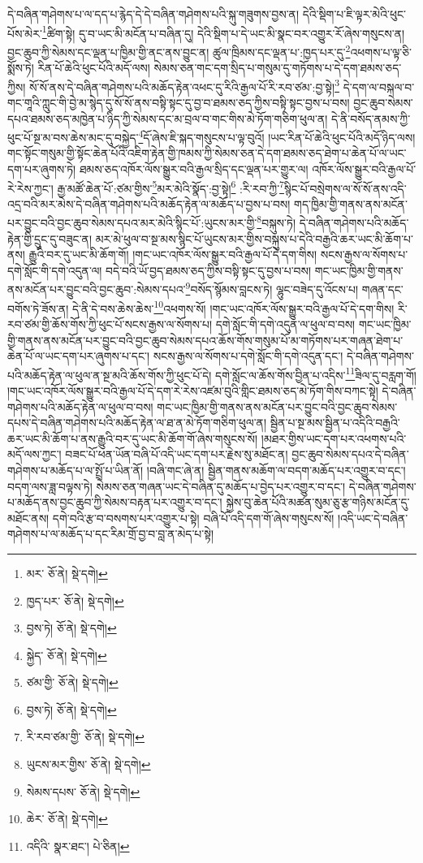དེ་བཞིན་གཤེགས་པ་ལ་དད་པ་རྙེད་དེ་དེ་བཞིན་གཤེགས་པའི་སྐུ་གཟུགས་བྱས་ན། དེའི་སྡིག་པ་ཇི་ལྟར་མེའི་ཕུང་པོས་མེར་\footnote{མར་  ཅོ་ནེ།  སྡེ་དགེ། }ཚིག་སྟེ། དུ་བ་ཡང་མི་མངོན་པ་བཞིན་དུ། དེའི་སྡིག་པ་དེ་ཡང་མི་སྣང་བར་འགྱུར་རོ་ཞེས་གསུངས་ན། བྱང་ཆུབ་ཀྱི་སེམས་དང་ལྡན་པ་ཁྱིམ་གྱི་ནང་ནས་བྱུང་ན། ཚུལ་ཁྲིམས་དང་ལྡན་པ་:ཁྱད་པར་དུ་\footnote{ཁྱད་པར་  ཅོ་ནེ།  སྡེ་དགེ། }འཕགས་པ་ལྟ་ཅི་སྨོས་ཏེ། རིན་པོ་ཆེའི་ཕུང་པོའི་མདོ་ལས། སེམས་ཅན་གང་དག་སྲིད་པ་གསུམ་དུ་གཏོགས་པ་དེ་དག་ཐམས་ཅད་ཀྱིས། སོ་སོ་ནས་དེ་བཞིན་གཤེགས་པའི་མཆོད་རྟེན་འཕང་དུ་རིའི་རྒྱལ་པོ་རི་རབ་ཙམ་:བྱ་སྟེ།\footnote{བྱས་ཏེ།  ཅོ་ནེ།  སྡེ་དགེ། } དེ་དག་ལ་བསྐལ་བ་གང་གཱའི་ཀླུང་གི་བྱེ་མ་སྙེད་དུ་སོ་སོ་ནས་བསྟི་སྟང་དུ་བྱ་བ་ཐམས་ཅད་ཀྱིས་བསྟི་སྟང་བྱས་པ་བས། བྱང་ཆུབ་སེམས་དཔའ་ཐམས་ཅད་མཁྱེན་པ་ཉིད་ཀྱི་སེམས་དང་མ་བྲལ་བ་གང་གིས་མེ་ཏོག་གཅིག་ཕུལ་ན། དེ་ནི་བསོད་ནམས་ཀྱི་ཕུང་པོ་སྔ་མ་བས་ཆེས་མང་དུ་བསྐྱེད་\footnote{སྐྱེད་  ཅོ་ནེ།  སྡེ་དགེ། }དོ་ཞེས་ཇི་སྐད་གསུངས་པ་ལྟ་བུའོ། །ཡང་རིན་པོ་ཆེའི་ཕུང་པོའི་མདོ་ཉིད་ལས། གང་སྟོང་གསུམ་གྱི་སྟོང་ཆེན་པོའི་འཇིག་རྟེན་གྱི་ཁམས་ཀྱི་སེམས་ཅན་དེ་དག་ཐམས་ཅད་ཐེག་པ་ཆེན་པོ་ལ་ཡང་དག་པར་ཞུགས་ཏེ། ཐམས་ཅད་འཁོར་ལོས་སྒྱུར་བའི་རྒྱལ་སྲིད་དང་ལྡན་པར་གྱུར་ལ། འཁོར་ལོས་སྒྱུར་བའི་རྒྱལ་པོ་རེ་རེས་ཀྱང་། རྒྱ་མཚོ་ཆེན་པོ་:ཙམ་གྱིས་\footnote{ཙམ་གྱི་  ཅོ་ནེ།  སྡེ་དགེ། }མར་མེའི་སྣོད་:བྱ་སྟེ།\footnote{བྱས་ཏེ།  ཅོ་ནེ།  སྡེ་དགེ། } :རི་རབ་ཀྱི་\footnote{རི་རབ་ཙམ་གྱི་  ཅོ་ནེ།  སྡེ་དགེ། }སྙིང་པོ་བསྲེགས་ལ་སོ་སོ་ནས་འདི་འདྲ་བའི་མར་མེས་དེ་བཞིན་གཤེགས་པའི་མཆོད་རྟེན་ལ་མཆོད་པ་བྱས་པ་བས། གད་ཁྱིམ་གྱི་གནས་ནས་མངོན་པར་བྱུང་བའི་བྱང་ཆུབ་སེམས་དཔའ་མར་མེའི་སྙིང་པོ་:ཡུངས་མར་གྱི་\footnote{ཡུངས་མར་གྱིས་  ཅོ་ནེ།  སྡེ་དགེ། }བསྐུས་ཏེ། དེ་བཞིན་གཤེགས་པའི་མཆོད་རྟེན་གྱི་དྲུང་དུ་བཟུང་ན། མར་མེ་ཕུལ་བ་སྔ་མས་སྙིང་པོ་ཡུངས་མར་གྱིས་བསྐུས་པ་དེའི་བརྒྱའི་ཆར་ཡང་མི་ཆོག་པ་ནས། རྒྱུའི་བར་དུ་ཡང་མི་ཆོག་གོ། །གང་ཡང་འཁོར་ལོས་སྒྱུར་བའི་རྒྱལ་པོ་དེ་དག་གིས། སངས་རྒྱས་ལ་སོགས་པ་དགེ་སློང་གི་དགེ་འདུན་ལ། བདེ་བའི་ཡོ་བྱད་ཐམས་ཅད་ཀྱིས་བསྟི་སྟང་དུ་བྱས་པ་བས། གང་ཡང་ཁྱིམ་གྱི་གནས་ནས་མངོན་པར་བྱུང་བའི་བྱང་ཆུབ་:སེམས་དཔའ་\footnote{སེམས་དཔས་  ཅོ་ནེ།  སྡེ་དགེ། }བསོད་སྙོམས་བླངས་ཏེ། ལྷུང་བཟེད་དུ་འོངས་པ། གཞན་དང་བགོས་ཏེ་ཟོས་ན། དེ་ནི་དེ་བས་ཆེས་ཆེས་\footnote{ཆེར་  ཅོ་ནེ།  སྡེ་དགེ། }འཕགས་སོ། །གང་ཡང་འཁོར་ལོས་སྒྱུར་བའི་རྒྱལ་པོ་དེ་དག་གིས། རི་རབ་ཙམ་གྱི་ཆོས་གོས་ཀྱི་ཕུང་པོ་སངས་རྒྱས་ལ་སོགས་པ། དགེ་སློང་གི་དགེ་འདུན་ལ་ཕུལ་བ་བས། གང་ཡང་ཁྱིམ་གྱི་གནས་ནས་མངོན་པར་བྱུང་བའི་བྱང་ཆུབ་སེམས་དཔའ་ཆོས་གོས་གསུམ་པོ་མ་གཏོགས་པར་གཞན་ཐེག་པ་ཆེན་པོ་ལ་ཡང་དག་པར་ཞུགས་པ་དང་། སངས་རྒྱས་ལ་སོགས་པ་དགེ་སློང་གི་དགེ་འདུན་དང་། དེ་བཞིན་གཤེགས་པའི་མཆོད་རྟེན་ལ་ཕུལ་ན་སྔ་མའི་ཆོས་གོས་ཀྱི་ཕུང་པོ་དེ། དགེ་སློང་ལ་ཆོས་གོས་བྱིན་པ་འདིས་\footnote{འདིའི་  སྣར་ཐང་།  པེ་ཅིན། }ཟིལ་དུ་བརླག་གོ། །གང་ཡང་འཁོར་ལོས་སྒྱུར་བའི་རྒྱལ་པོ་དེ་དག་རེ་རེས་འཛམ་བུའི་གླིང་ཐམས་ཅད་མེ་ཏོག་གིས་བཀང་སྟེ། དེ་བཞིན་གཤེགས་པའི་མཆོད་རྟེན་ལ་ཕུལ་བ་བས། གང་ཡང་ཁྱིམ་གྱི་གནས་ནས་མངོན་པར་བྱུང་བའི་བྱང་ཆུབ་སེམས་དཔས་དེ་བཞིན་གཤེགས་པའི་མཆོད་རྟེན་ལ་ཐ་ན་མེ་ཏོག་གཅིག་ཕུལ་ན། སྦྱིན་པ་སྔ་མས་སྦྱིན་པ་འདིའི་བརྒྱའི་ཆར་ཡང་མི་ཆོག་པ་ནས་རྒྱུའི་བར་དུ་ཡང་མི་ཆོག་གོ་ཞེས་གསུངས་སོ། །མཐར་གྱིས་ཡང་དག་པར་འཕགས་པའི་མདོ་ལས་ཀྱང་། བཟང་པོ་ཕན་ཡོན་བཞི་པོ་འདི་ཡང་དག་པར་རྗེས་སུ་མཐོང་ན། བྱང་ཆུབ་སེམས་དཔའ་དེ་བཞིན་གཤེགས་པ་མཆོད་པ་ལ་སྤྲོ་པ་ཡིན་ནོ། །བཞི་གང་ཞེ་ན། སྦྱིན་གནས་མཆོག་ལ་བདག་མཆོད་པར་འགྱུར་བ་དང་། བདག་ལས་ཟླ་བལྟས་ཏེ། སེམས་ཅན་གཞན་ཡང་དེ་བཞིན་དུ་མཆོད་པ་བྱེད་པར་འགྱུར་བ་དང་། དེ་བཞིན་གཤེགས་པ་མཆོད་ནས་བྱང་ཆུབ་ཀྱི་སེམས་བརྟན་པར་འགྱུར་བ་དང་། སྐྱེས་བུ་ཆེན་པོའི་མཚན་སུམ་ཅུ་རྩ་གཉིས་མངོན་དུ་མཐོང་ནས། དགེ་བའི་རྩ་བ་བསགས་པར་འགྱུར་པ་སྟེ། བཞི་པོ་འདི་དག་གོ་ཞེས་གསུངས་སོ། །འདི་ཡང་དེ་བཞིན་གཤེགས་པ་ལ་མཆོད་པ་དང་རིམ་གྲོ་བྱ་བ་བླ་ན་མེད་པ་སྟེ། 